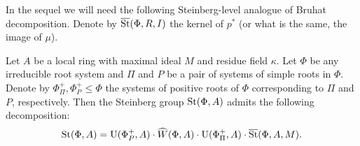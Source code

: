 In the sequel we will need the following Steinberg-level analogue of Bruhat decomposition.
Denote by $\overline{\operatorname{St}}(\Phi, R, I)$ the kernel of $p^*$ (or what is the same, the image of $\mu$).
\begin{lemma}\label{lem:bruhat}
Let $A$ be a local ring with maximal ideal $M$ and residue field $\kappa$.
Let $\Phi$ be any irreducible root system and $\Pi$ and $P$ be a pair of systems of simple roots in $\Phi$.
Denote by $\Phi^+_\Pi, \Phi^+_{P} \leq \Phi$ the systems of positive roots of $\Phi$ corresponding to $\Pi$ and $P$, respectively.
Then the Steinberg group $\operatorname{St}(\Phi, A)$ admits the following decomposition:
\begin{equation}\label{eq:bruhat}
\operatorname{St}(\Phi,A) =\operatorname{U}(\Phi^+_{P}, A)\cdot \widehat{W}(\Phi, A) \cdot \operatorname{U}(\Phi^+_{\Pi}, A) \cdot \overline{\operatorname{St}}(\Phi, A, M).
\end{equation}
\begin{comment}
Moreover, if for some $u,u'\in \UU(\Phi^{+}_{P}, A)$, $v, v' \in \UU(\Phi^+_{\Pi}, A)$, $w,w'\in \StW(\Phi, A)$ and $l,l'\in \overline{\St}(\Phi, A, M)$ one has
 \begin{equation} \label{eq:bwb-eq} uwvl=u'w'v'l', \end{equation} then
$\overline{w}=\overline{w'} \in W(\Phi)$ and $w^{-1}w' \in \StH(\Phi, A) \cap \overline{\St}(\Phi, A, M)$.
\end{comment}
\end{lemma}
